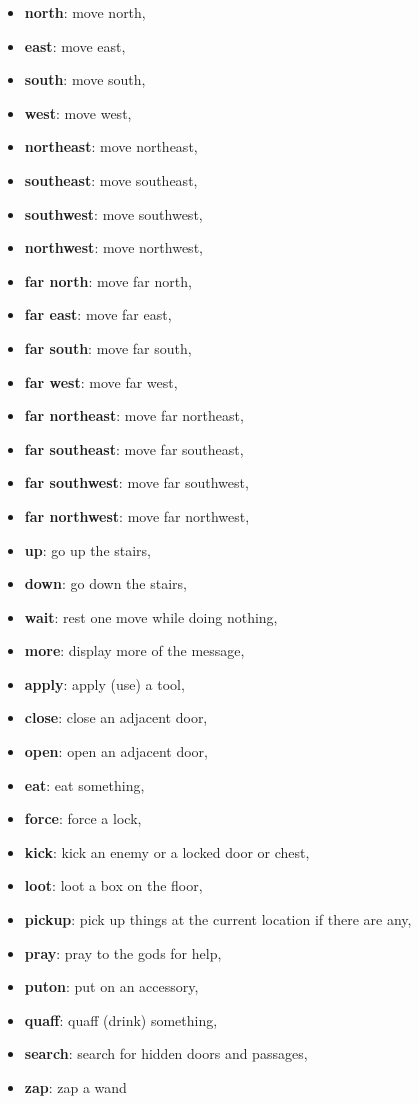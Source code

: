 \begin{MyGreenBox}[frametitle={\textbf{Iteration 0 MiniHack Prompt}}]
\begin{itemize}
\item \textbf{north}: move north,
\item \textbf{east}: move east,
\item \textbf{south}: move south,
\item \textbf{west}: move west,
\item \textbf{northeast}: move northeast,
\item \textbf{southeast}: move southeast,
\item \textbf{southwest}: move southwest,
\item \textbf{northwest}: move northwest,
\item \textbf{far north}: move far north,
\item \textbf{far east}: move far east,
\item \textbf{far south}: move far south,
\item \textbf{far west}: move far west,
\item \textbf{far northeast}: move far northeast,
\item \textbf{far southeast}: move far southeast,
\item \textbf{far southwest}: move far southwest,
\item \textbf{far northwest}: move far northwest,
\item \textbf{up}: go up the stairs,
\item \textbf{down}: go down the stairs,
\item \textbf{wait}: rest one move while doing nothing,
\item \textbf{more}: display more of the message,
\item \textbf{apply}: apply (use) a tool,
\item \textbf{close}: close an adjacent door,
\item \textbf{open}: open an adjacent door,
\item \textbf{eat}: eat something,
\item \textbf{force}: force a lock,
\item \textbf{kick}: kick an enemy or a locked door or chest,
\item \textbf{loot}: loot a box on the floor,
\item \textbf{pickup}: pick up things at the current location if there are any,
\item \textbf{pray}: pray to the gods for help,
\item \textbf{puton}: put on an accessory,
\item \textbf{quaff}: quaff (drink) something,
\item \textbf{search}: search for hidden doors and passages,
\item \textbf{zap}: zap a wand
\end{itemize}


\end{MyGreenBox}
